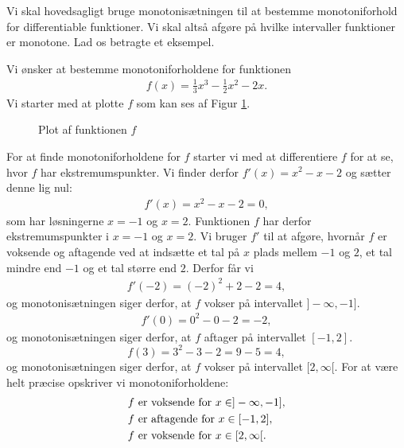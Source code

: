 Vi skal hovedsagligt bruge monotonisætningen til at bestemme monotoniforhold for differentiable funktioner. Vi skal altså afgøre på hvilke intervaller funktioner er monotone. Lad os betragte et eksempel.
\begin{exa}
Vi ønsker at bestemme monotoniforholdene for funktionen 
\begin{align*}
	f(x) = \frac{1}{3}x^3-\frac{1}{2}x^2-2x.
\end{align*}
 Vi starter med at plotte $f$ som kan ses af Figur \ref{fig:monof}.

\begin{figure}[H]
\centering
{}
\caption{Plot af funktionen $f$}
\label{fig:monof}
\end{figure}
For at finde monotoniforholdene for $f$ starter vi med at differentiere $f$ for at se, hvor $f$ har ekstremumspunkter. Vi finder derfor $f'(x) = x^2-x-2$ og sætter denne lig nul:
\begin{align*}
f'(x)=x^2-x-2 = 0,
\end{align*}
som har løsningerne $x=-1$ og $x=2$. Funktionen $f$ har derfor ekstremumspunkter i $x=-1$ og $x=2$. Vi bruger $f'$ til at afgøre, hvornår $f$ er voksende og aftagende ved at indsætte et tal på $x$ plads mellem $-1$ og $2$, et tal mindre end $-1$ og et tal større end $2$. Derfor får vi
\begin{align*}
f'(-2) = (-2)^2+2-2 = 4, 
\end{align*} 
og monotonisætningen siger derfor, at $f$ vokser på intervallet $]-\infty,-1]$. 
\begin{align*}
f'(0) = 0^2-0-2 = -2,
\end{align*}
og monotonisætningen siger derfor, at $f$ aftager på intervallet $[-1,2]$.
\[ 
f(3) = 3^2-3-2 = 9-5=4,
\]
og monotonisætningen siger derfor, at $f$ vokser på intervallet $[2,\infty[.$
For at være helt præcise opskriver vi monotoniforholdene:
\begin{align*}
	&\textnormal{$f$ er voksende for $x \in ]-\infty,-1]$},\\
	&\textnormal{$f$ er aftagende for $x \in [-1,2]$},\\
	&\textnormal{$f$ er voksende for $x \in [2,\infty[$}.
\end{align*}

\end{exa}
